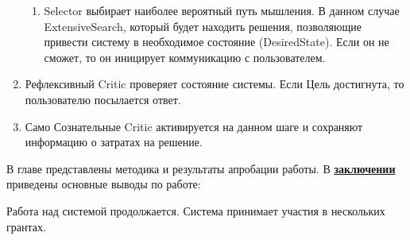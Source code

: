 \begin{enumerate}
\begin{enumerate}
	\item Selector выбирает наиболее вероятный путь мышления. В данном случае ExtensiveSearch, который будет находить решения, позволяющие привести систему в необходимое состояние (DesiredState). Если он не сможет, то он иницирует коммуникацию с пользователем. 
 \end{enumerate}
	 \item Рефлексивный Critic проверяет состояние системы. Если Цель достигнута, то пользователю посылается ответ.
	 \item Само Сознательные Critic активируется на данном шаге и сохраняют информацию о затратах на решение.

\end{enumerate}
В главе представлены методика и результаты апробации работы.
В \underline{\textbf{заключении}} приведены основные выводы по работе:


Работа над системой продолжается. Система принимает участия в нескольких грантах. 

\renewcommand{\refname}{\large Публикации автора по теме диссертации}
\nocite{*}
\insertbiblioall

